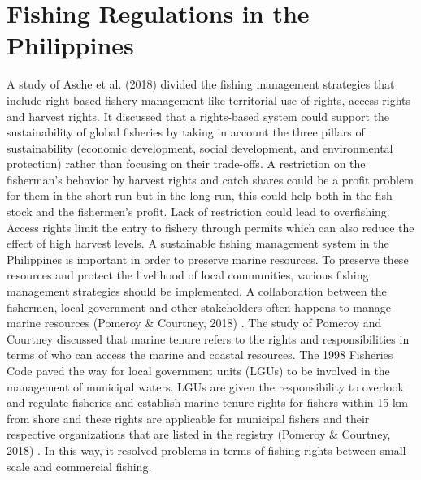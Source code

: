 \section{Fishing Regulations in the Philippines}

A study of Asche et al. (2018) \nocite{rrl-FRP1} divided the fishing management strategies that include right-based fishery management like territorial use of rights, access rights and harvest rights. It discussed that a rights-based system could support the sustainability of global fisheries by taking in account the three pillars of sustainability (economic development, social development, and environmental protection) rather than focusing on their trade-offs. A restriction on the fisherman’s behavior by harvest rights and catch shares could be a profit problem for them in the short-run but in the long-run, this could help both in the fish stock and the fishermen’s profit. Lack of restriction could lead to overfishing. Access rights limit the entry to fishery through permits which can also reduce the effect of high harvest levels. A sustainable fishing management system in the Philippines is important in order to preserve marine resources. To preserve these resources and protect the livelihood of local communities, various fishing management strategies should be implemented. A collaboration between the fishermen, local government and other stakeholders often happens to manage marine resources (Pomeroy \& Courtney, 2018) \nocite{rrl-FRP2}. The study of Pomeroy and Courtney discussed that marine tenure refers to the rights and responsibilities in terms of who can access the marine and coastal resources. The 1998 Fisheries Code paved the way for local government units (LGUs) to be involved in the management of municipal waters. LGUs are given the responsibility to overlook and regulate fisheries and establish marine tenure rights for fishers within 15 km from shore  and these rights are applicable for municipal fishers and their respective organizations that are listed in the registry (Pomeroy \& Courtney, 2018) \nocite{rrl-FRP2}. In this way, it resolved problems in terms of fishing rights between small-scale and commercial fishing.

